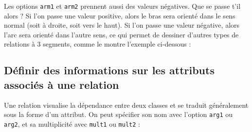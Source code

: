 \documentclass[a4paper,11pt]{report}
\newcommand{\inputTikZ}[1]{%
  }%
\newcommand{\inputTikZ}[1]{%
    \texttt{[image: fig/\#1.pdf]}%
  }%
\begin{document}
\medskip

\begin{minipage}{0.5\textwidth}

\end{minipage}
\begin{minipage}{0.4\textwidth}
\begin{center}
\inputTikZ{figure11}
\end{center}
\end{minipage}

\medskip

\begin{minipage}{0.5\textwidth}

\end{minipage}
\begin{minipage}{0.4\textwidth}
\begin{center}
\inputTikZ{figure12}
\end{center}
\end{minipage}

\medskip

Les options {\tt arm1} et {\tt arm2} prennent aussi des valeurs négatives. Que se passe t'il alors ?
Si l'on passe une valeur positive, alors le bras sera orienté dans le sens normal (soit à droite, soit vers le haut). Si l'on passe une valeur négative, alors l'arc sera orienté dans l'autre sens, ce qui permet de dessiner d'autres types de relations à 3 segments, comme le montre l'exemple ci-dessous :

\medskip

\begin{minipage}{0.5\textwidth}

\end{minipage}
\begin{minipage}{0.4\textwidth}
\begin{center}
\inputTikZ{figure13}
\end{center}
\end{minipage}


\subsection{Définir des informations sur les attributs associés à une relation}\label{ss.relattr}

Une relation visualise la dépendance entre deux classes et se traduit généralement sous la forme d'un attribut. On peut spécifier son nom avec l'option {\tt arg1} ou {\tt arg2}, et sa multiplicité avec {\tt mult1} ou {\tt mult2} :

\medskip
\end{document}

